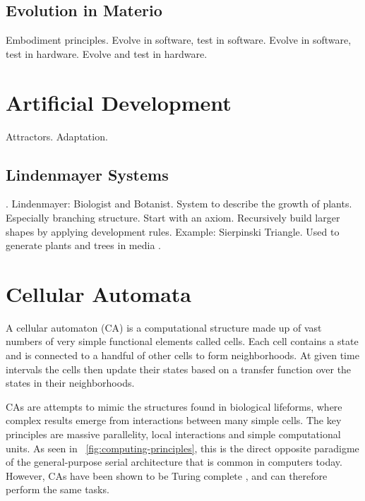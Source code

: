 \subsection{Evolution in Materio}

\TODO
Embodiment principles.
Evolve in software, test in software.
Evolve in software, test in hardware.
Evolve and test in hardware.


\section{Artificial Development}

\TODO
Attractors.
Adaptation.

\subsection{Lindenmayer Systems}

\TODO
\cite{prusinkiewicz1990lindenmayer}.
Lindenmayer: Biologist and Botanist.
System to describe the growth of plants.
Especially branching structure.
Start with an axiom.
Recursively build larger shapes by applying development rules.
Example: Sierpinski Triangle.
Used to generate plants and trees in media \CN.


\section{Cellular Automata}

A cellular automaton (CA) is a computational structure made up of vast numbers of very simple functional elements called cells.
Each cell contains a state and is connected to a handful of other cells to form neighborhoods.
At given time intervals the cells then update their states based on a transfer function over the states in their neighborhoods.

CAs are attempts to mimic the structures found in biological lifeforms, where complex results emerge from interactions between many simple cells.
The key principles are massive parallelity, local interactions and simple computational units.
As seen in \figurename~\ref{fig:computing-principles}, this is the direct opposite paradigme of the general-purpose serial architecture that is common in computers today.
However, CAs have been shown to be Turing complete \cite{codd1968cellular, neumann1966selfreplication}, and can therefore perform the same tasks.

